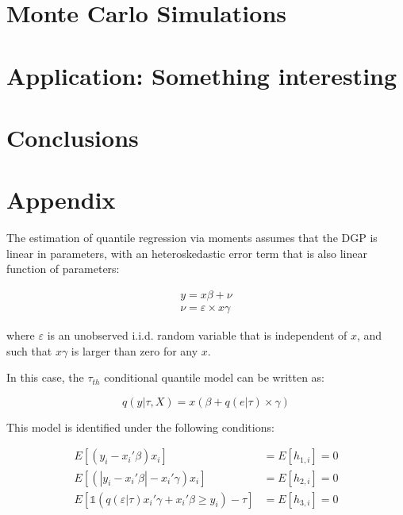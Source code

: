 \documentclass[
  authoryear,
  preprint,
  1p]{elsarticle}
\begin{document}
\hypertarget{monte-carlo-simulations}{%
\section{Monte Carlo Simulations}\label{monte-carlo-simulations}}

\hypertarget{application-something-interesting}{%
\section{\texorpdfstring{Application: \textbf{Something
interesting}}{Application: Something interesting}}\label{application-something-interesting}}

\hypertarget{conclusions}{%
\section{Conclusions}\label{conclusions}}

\hypertarget{appendix}{%
\section{Appendix}\label{appendix}}

The estimation of quantile regression via moments assumes that the DGP
is linear in parameters, with an heteroskedastic error term that is also
linear function of parameters:

\[\begin{aligned}
y = x\beta + \nu \\
\nu = \varepsilon \times x\gamma
\end{aligned}
\]

where \(\varepsilon\) is an unobserved i.i.d. random variable that is
independent of \(x\), and such that \(x\gamma\) is larger than zero for
any \(x\).

In this case, the \(\tau_{th}\) conditional quantile model can be
written as:

\[q(y|\tau,X) = x(\beta + q(e|\tau) \times \gamma)\]

This model is identified under the following conditions:

\[\begin{aligned}
  E[(y_i-x_i'\beta)x_i ]  &= E[h_{1,i}]=0 \\
  E[ (|y_i-x_i'\beta|-x_i' \gamma) x_i ] &=E[h_{2,i}]=0 \\
  E\left[  \mathbb{1}\left( q(\varepsilon|\tau) x_i'\gamma +x_i'\beta\geq  y_i  \right) - \tau \right] 
   &=E[h_{3,i}]=0 
\end{aligned}
\]
\end{document}
